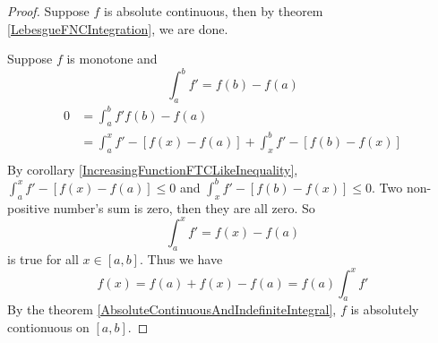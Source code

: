 \documentclass[lang=en, 12pt]{elegantbook}
\begin{document}
            \begin{proof}
                Suppose $f$ is absolute continuous, then by theorem 
            \ref{LebesgueFNCIntegration}, we are done.\par
                Suppose $f$ is monotone and 
                $$\int_a^b f' = f(b) -f(a)$$
                \begin{equation*}
                    \begin{aligned}
                        0 &= \int_a^b f' f(b) - f(a)\\
                        &= \int_a^x f' -[f(x) -f(a)] + \int_x^b f' -[f(b)-f(x)]\\
                    \end{aligned}
                \end{equation*}
                By corollary \ref{IncreasingFunctionFTCLikeInequality},
            $\int_a^x f' -[f(x) -f(a)] \leq 0$ and $\int_x^b f' -[f(b) -f(x)] \leq 0$.
            Two non-positive number's sum is zero, then they are all zero.
                So 
                $$\int_a^x f' = f(x) -f(a)$$
                is true for all $x \in [a,b]$. Thus we have 
                $$f(x) = f(a) +f(x) -f(a)= f(a) \int_a^x f' $$
                By the theorem \ref{AbsoluteContinuousAndIndefiniteIntegral},
            $f$ is absolutely contionuous on $[a,b]$.  
            \end{proof}
            
\end{document}
